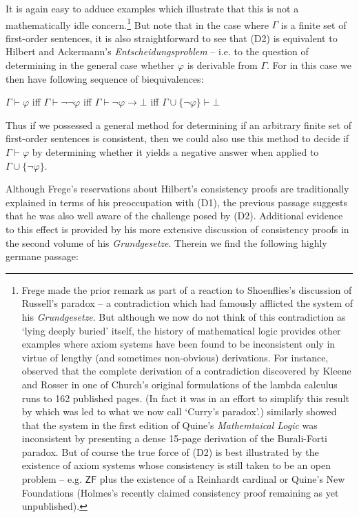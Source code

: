 \documentclass[11pt,fleqn,leqno]{article}
\def\phi{\varphi}
\def\proves{\vdash}
\begin{document}
It is again easy to adduce examples which illustrate that this is not a mathematically idle concern.\footnote{Frege made the prior remark as part of a reaction to Shoenflies's discussion of Russell's paradox -- a contradiction which had famously afflicted the system of his \textsl{Grundgesetze}.   But although we now do not think of this contradiction as `lying deeply buried' itself, the history of mathematical logic provides other examples where axiom systems have been found to be inconsistent only in virtue of lengthy (and sometimes non-obvious) derivations.   For instance, \citet{Curry1941} observed that the complete derivation of a contradiction discovered by Kleene and Rosser in one of Church's original formulations of the lambda calculus runs to 162 published pages.  (In fact it was in an effort to simplify this result by which \citet{Curry1942} was led to what we now call `Curry's paradox'.)  \citet{Rosser1942} similarly showed that the system in the first edition of Quine's \textsl{Mathemtaical Logic} was inconsistent by presenting a dense 15-page derivation of the Burali-Forti paradox.   But of course the true force of (D2) is best illustrated by the existence of axiom systems whose consistency is still taken to be an open problem -- e.g. $\mathsf{ZF}$ plus the existence of a Reinhardt cardinal or Quine's New Foundations (Holmes's recently claimed consistency proof remaining as yet unpublished).}  But note that in the case where $\Gamma$ is a finite set of first-order sentences, it is also straightforward to see that (D2) is equivalent to Hilbert and Ackermann's \textsl{Entscheidungsproblem} -- i.e. to the question of determining in the general case whether $\phi$ is derivable from $\Gamma$.  For in this case we then have following sequence of biequivalences: 
\begin{example}
\label{red1}
 $\Gamma \proves \phi$ iff $\Gamma \proves \neg \neg \phi$ iff $\Gamma \proves \neg \phi \rightarrow \bot$ iff $\Gamma \cup \{\neg \phi\} \proves \bot$
\end{example}
Thus if we possessed a general method for determining if an arbitrary finite set of first-order sentences is consistent, then we could also use this method to decide if $\Gamma \proves \phi$ by determining whether it yields a negative answer when applied to $\Gamma \cup \{\neg \phi\}$.

Although Frege's reservations about Hilbert's consistency proofs are traditionally explained in terms of his preoccupation with (D1), the previous passage suggests that he was also well aware of the challenge posed by (D2).  Additional evidence to this effect is provided by his more extensive discussion of consistency proofs in the second volume of his \textsl{Grundgesetze}.   Therein we find the following highly germane passage:
\end{document}
